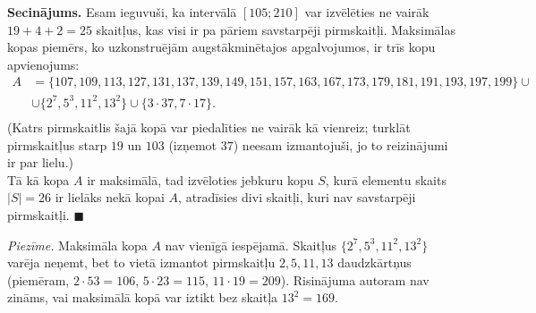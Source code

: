 \documentclass[a4paper,12pt]{article}
\begin{document}
{\bf Secinājums.} Esam ieguvuši, ka intervālā $[105;210]$ var izvēlēties ne vairāk 
$19 + 4 + 2 = 25$ skaitļus, kas visi ir pa pāriem savstarpēji pirmskaitļi. 
Maksimālas kopas piemērs, ko uzkonstruējām augstākminētajos apgalvojumos, ir trīs kopu apvienojums:
$$\begin{aligned}
A & = \{ 107, 109, 113, 127, 131, 137, 139, 149, 151, 157, 163, 167, 173, 179, 181, 191, 193, 197, 199\} \cup \nonumber \\
  & \cup \{ 2^7,5^3,11^2,13^2 \} \cup \{ 3 \cdot 37, 7 \cdot 17 \}. \nonumber \\
\end{aligned}$$
(Katrs pirmskaitlis šajā kopā var piedalīties ne vairāk kā vienreiz; turklāt pirmskaitļus 
starp $19$ un $103$ (izņemot $37$) neesam izmantojuši, jo to reizinājumi ir par lielu.)\\
Tā kā kopa $A$ ir maksimālā, tad izvēloties jebkuru kopu $S$, kurā elementu skaits $|S| = 26$ ir lielāks nekā 
kopai $A$, atradīsies divi skaitļi, kuri nav savstarpēji pirmskaitļi. $\blacksquare$

\vspace{5pt}
{\em Piezīme.} Maksimāla kopa $A$ nav vienīgā iespējamā. 
Skaitļus $\{ 2^7,5^3,11^2,13^2 \}$ varēja neņemt, bet to vietā izmantot pirmskaitļu 
$2,5,11,13$ daudzkārtņus (piemēram, $2 \cdot 53 = 106$, $5 \cdot 23 = 115$,  
$11 \cdot 19 = 209$). Risinājuma autoram nav zināms, vai maksimālā kopā 
var iztikt bez skaitļa $13^2 = 169$. 


\newpage
\end{document}
